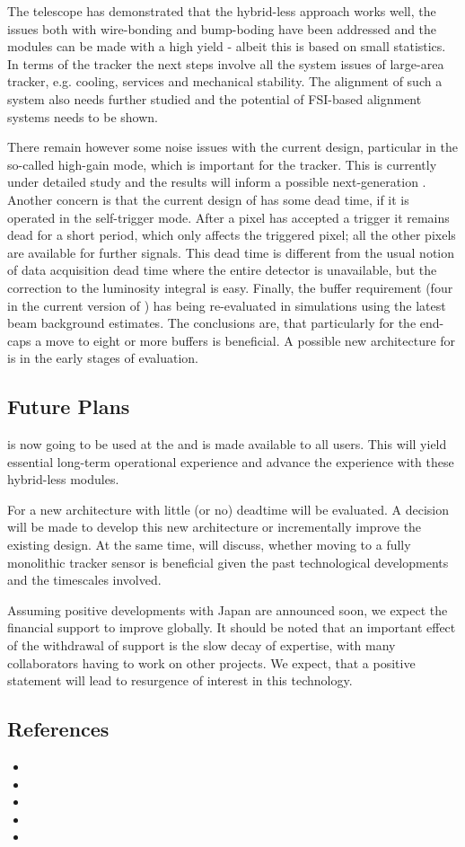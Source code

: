 The \LYCORIS telescope has demonstrated that the hybrid-less approach works well, the issues both with wire-bonding and 
bump-boding have been addressed and the modules can be made with a high yield - albeit this is based on small statistics.
In terms of the \SID tracker the next steps involve all the system issues of large-area tracker, e.g. cooling, services and mechanical stability. 
The alignment of such a system also needs further studied and the potential of FSI-based alignment systems needs to be shown. 

There remain however some noise issues with the current \KPIX design, particular in the so-called high-gain mode, 
which is important for the tracker. This is currently under detailed study and the results will inform a possible 
next-generation \KPIX. Another concern is that the current design of \KPIX has some dead time, if it is operated in the self-trigger mode. 
After a pixel has accepted a trigger it remains dead for a short period, which only affects the triggered pixel; all the other 
pixels are available for further signals. This dead time is different from the usual 
notion of data acquisition dead time where the entire detector is unavailable, 
but the correction to the luminosity integral is easy. Finally, the buffer 
requirement (four in the current version of \KPIX) has being re-evaluated in \SID  
simulations using the latest beam background estimates. The conclusions are, that particularly for 
the end-caps a move to eight or more buffers is beneficial. A possible new architecture for \KPIX is in 
the early stages of evaluation.


\subsection{Future Plans}
\LYCORIS is now going to be used at the \DIITBF and is made available to all users. This will yield essential long-term operational experience and 
advance the experience with these hybrid-less modules.  

For \KPIX a new architecture with little (or no) deadtime will be evaluated. A decision will be made to develop this new architecture or incrementally 
improve the existing design. At the same time, \SID will discuss, whether moving to a fully monolithic tracker sensor is beneficial given the past technological 
developments and the timescales involved.
	
Assuming positive developments with Japan are announced soon, we expect the financial support to improve globally. It should be noted that
an important effect of the withdrawal of support is the slow decay of expertise, with many collaborators having to work on other projects. We expect, that 
a positive statement will lead to resurgence of interest in this technology.

	
\subsection{References}

\begin{itemize}
\item {}
\item {}
\item {}
\item {}
\item {}
\end{itemize}
